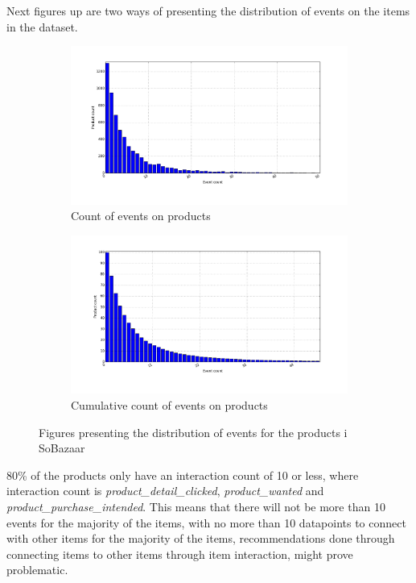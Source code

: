         Next figures up are two ways of presenting the distribution of events on the items in the dataset.

    \begin{figure}[H]
        \centering
        \begin{subfigure}{.5\textwidth}
            \includegraphics[width=\dualGraphWidth]{image/product_iddistribution.png}
            \centering
            \caption{Count of events on products}
    \label{figure:eventsPerproduct}
        \end{subfigure}%
        \begin{subfigure}{.5\textwidth}
            \includegraphics[width=\dualGraphWidth]{image/product_idcumdistribution.png}
            \centering
            \caption{Cumulative count of events on products}
    \label{figure:eventsPerproductCum}
        \end{subfigure}
        \caption{Figures presenting the distribution of events for the products i SoBazaar}
    \end{figure}
        80\% of the products only have an interaction count of 10 or less, where interaction count is \emph{product\_detail\_clicked}, \emph{product\_wanted} and \emph{product\_purchase\_intended}.
        This means that there will not be more than 10 events for the majority of the items, with no more than 10 datapoints to connect with other items for the majority of the items, recommendations done through connecting items to other items through item interaction, might prove problematic.

